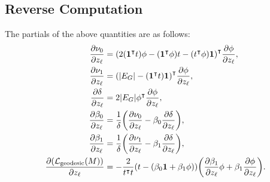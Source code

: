 \subsection{Reverse Computation}
The partials of the above quantities are as follows: \begin{align*}
	\frac{\partial\nu_0}{\partial z_\ell} &= \pof{2\pof{\mathbf{1}^\intercal t}\phi - \pof{\mathbf{1}^\intercal\phi}t - \pof{t^\intercal\phi}\mathbf{1}}^\intercal\frac{\partial\phi}{\partial z_\ell}, \\
	\frac{\partial\nu_1}{\partial z_\ell} &= \pof{\abs{E_G} - \pof{\mathbf{1}^\intercal t}\mathbf{1}}^\intercal\frac{\partial\phi}{\partial z_\ell}, \\
	\frac{\partial\delta}{\partial z_\ell} &= 2\abs{E_G}\phi^\intercal\frac{\partial\phi}{\partial z_\ell}, \\
	\frac{\partial\beta_0}{\partial z_\ell} &= \frac{1}{\delta}\pof{\frac{\partial\nu_0}{\partial z_\ell} - \beta_0\frac{\partial\delta}{\partial z_\ell}}, \\
	\frac{\partial\beta_1}{\partial z_\ell} &= \frac{1}{\delta}\pof{\frac{\partial\nu_1}{\partial z_\ell} - \beta_1\frac{\partial\delta}{\partial z_\ell}}, \\
	\frac{\partial\pof{\mathcal{L}_{\mathrm{geodesic}}\pof{M}}}{\partial z_\ell} &= -\frac{2}{t^\intercal t}\pof{t - \pof{\beta_0\mathbf{1} + \beta_1\phi}}\pof{\frac{\partial\beta_1}{\partial z_\ell}\phi + \beta_1\frac{\partial\phi}{\partial z_\ell}}.
\end{align*}
